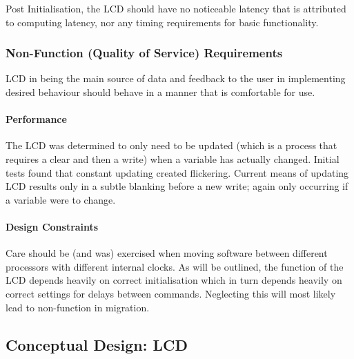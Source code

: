 \documentclass{article}
\begin{document}
Post Initialisation, the LCD should have no noticeable latency that is attributed to computing latency, nor any timing requirements for basic functionality.


\subsubsection{Non-Function (Quality of Service) Requirements}
LCD in being the main source of data and feedback to the user in implementing desired behaviour should behave in a manner that is comfortable for use.
\paragraph{Performance}
The LCD was determined to only need to be updated (which is a process that requires a clear and then a write) when a variable has actually changed. Initial tests found that constant updating created flickering. Current means of updating LCD results only in a subtle blanking before a new write; again only occurring if a variable were to change.

\paragraph{Design Constraints}
Care should be (and was) exercised when moving software between different processors with different internal clocks. As will be outlined, the function of the LCD depends heavily on correct initialisation which in turn depends heavily on correct settings for delays between commands. Neglecting this will most likely lead to non-function in migration.


\subsection{Conceptual Design: LCD}
\end{document}
